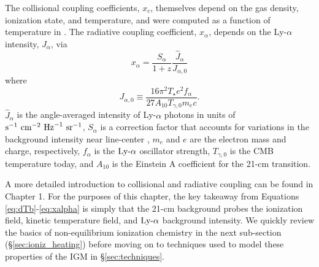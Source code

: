 The collisional coupling coefficients, $x_c$, themselves depend on the gas density, ionization state, and temperature, and were computed as a function of temperature in \cite{Zygelman2005}. The radiative coupling coefficient, $x_{\alpha}$, depends on the Ly-$\alpha$ intensity, $J_{\alpha}$, via
\begin{equation}
    x_{\alpha} = \frac{S_{\alpha}}{1+z} \frac{\hat{J}_{\alpha}}{{J}_{\alpha,0}} \label{eq:xalpha}
\end{equation}
where
\begin{equation}
    J_{\alpha,0} \equiv \frac{16\pi^2 T_{\star} e^2 f_{\alpha}}{27 A_{10} T_{\gamma,0} m_e c} . \label{eq:Jnorm}
\end{equation}
$\hat{J}_{\alpha}$ is the angle-averaged intensity of Ly-$\alpha$ photons in
units of $\text{s}^{-1} \ \text{cm}^{-2} \ \mathrm{Hz}^{-1} \ \text{sr}^{-1}$, $S_{\alpha}$ is a correction factor that
accounts for variations in the background intensity near line-center
\cite{Chen2004,FurlanettoPritchard2006,Hirata2006}, $m_e$ and $e$ are the
electron mass and charge, respectively, $f_{\alpha}$ is the $\text{Ly-}\alpha$ oscillator
strength, $T_{\gamma,0}$ is the CMB temperature today, and $A_{10}$ is the Einstein A coefficient for the 21-cm transition.

A more detailed introduction to collisional and radiative coupling can be found in Chapter 1. For the purposes of this chapter, the key takeaway from Equations \ref{eq:dTb}-\ref{eq:xalpha} is simply that the 21-cm background probes the ionization field, kinetic temperature field, and $\text{Ly-}\alpha$ background intensity. We quickly review the basics of non-equilibrium ionization chemistry in the next sub-section (\S\ref{sec:ioniz_heating}) before moving on to techniques used to model these properties of the IGM in \S\ref{sec:techniques}.


